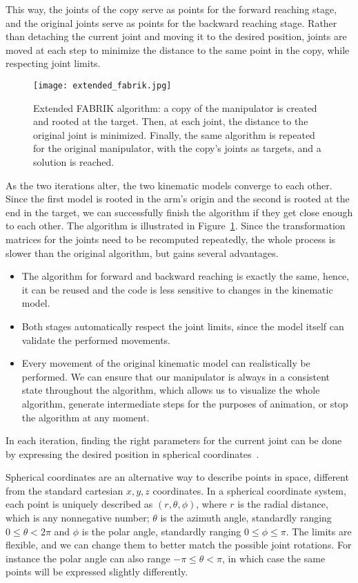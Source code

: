 This way, the joints of the copy serve as points for the forward reaching stage, and the original joints serve as points for the backward reaching stage. Rather than detaching the current joint and moving it to the desired position, joints are moved at each step to minimize the distance to the same point in the copy, while respecting joint limits.

\begin{figure}
  \centering
  \texttt{[image: extended\_fabrik.jpg]}
  \caption{Extended FABRIK algorithm: a copy of the manipulator is created and rooted at the target. Then, at each joint, the distance to the original joint is minimized. Finally, the same algorithm is repeated for the original manipulator, with the copy's joints as targets, and a solution is reached.}\label{fig:ext_fab}
\end{figure}

As the two iterations alter, the two kinematic models converge to each other. Since the first model is rooted in the arm's origin and the second is rooted at the end in the target, we can successfully finish the algorithm if they get close enough to each other. The algorithm is illustrated in Figure~\ref{fig:ext_fab}. Since the transformation matrices for the joints need to be recomputed repeatedly, the whole process is slower than the original algorithm, but gains several advantages.

\begin{itemize}
  \item The algorithm for forward and backward reaching is exactly the same, hence, it can be reused and the code is less sensitive to changes in the kinematic model.
  \item Both stages automatically respect the joint limits, since the model itself can validate the performed movements.
  \item Every movement of the original kinematic model can realistically be performed. We can ensure that our manipulator is always in a consistent state throughout the algorithm, which allows us to visualize the whole algorithm, generate intermediate steps for the purposes of animation, or stop the algorithm at any moment.
\end{itemize}

In each iteration, finding the right parameters for the current joint can be done by expressing the desired position in spherical coordinates~\cite{spherical}.

Spherical coordinates are an alternative way to describe points in space, different from the standard cartesian $x, y, z$ coordinates. In a spherical coordinate system, each point is uniquely described as $(r, \theta, \phi)$, where $r$ is the radial distance, which is any nonnegative number; $\theta$ is the azimuth angle, standardly ranging $0 \leq \theta < 2\pi$ and $\phi$ is the polar angle, standardly ranging $0 \leq \phi \leq \pi$. The limits are flexible, and we can change them to better match the possible joint rotations. For instance the polar angle can also range $-\pi \le \theta < \pi$, in which case the same points will be expressed slightly differently.

